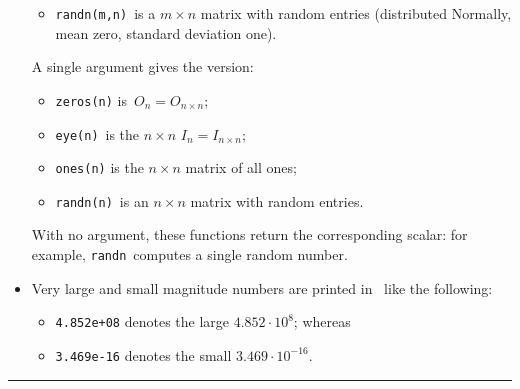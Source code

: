 \begin{table}
\begin{minipage}{\linewidth}
\begin{itemize}
\begin{itemize}
\item {}\verb|randn(m,n)|~is a \(m\times n\) matrix with random entries (distributed Normally, mean zero, standard deviation one).
\end{itemize}
A single argument gives the  version: 
\begin{itemize}
\item {}\verb|zeros(n)| is~\(O_n=O_{n\times n}\); 
\item \verb|eye(n)|~is the \(n\times n\)  \(I_n=I_{n\times n}\);  
\item \verb|ones(n)| is the \(n\times n\) matrix of all ones;
\item {}\verb|randn(n)|~is an \(n\times n\) matrix with random entries.
\end{itemize}
With no argument, these functions return the corresponding scalar: for example, \verb|randn|~computes a single random number.
\item Very large and small magnitude numbers are printed in \script\ like the following: 
\begin{itemize}
\item \verb|4.852e+08| denotes the large \(4.852\cdot10^8\); whereas 
\item \verb|3.469e-16| denotes the small \(3.469\cdot10^{-16}\).
\end{itemize}
\end{itemize}
\end{minipage}
\hrule
\end{table}

